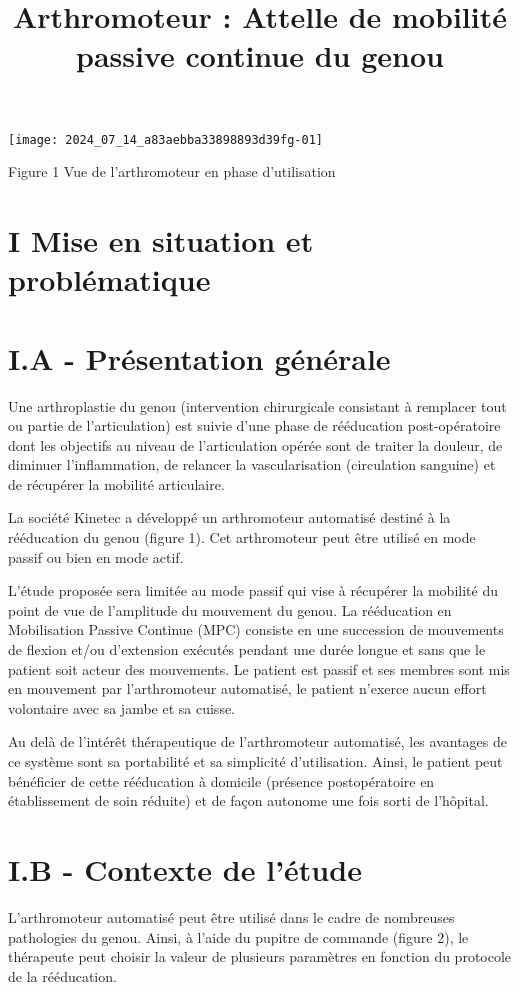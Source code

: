 

\title{Arthromoteur : Attelle de mobilité passive continue du genou }
\maketitle
\begin{center}
\texttt{[image: 2024\_07\_14\_a83aebba33898893d39fg-01]}
\end{center}

Figure 1 Vue de l'arthromoteur en phase d'utilisation

\section*{I Mise en situation et problématique}
\section*{I.A - Présentation générale}
Une arthroplastie du genou (intervention chirurgicale consistant à remplacer tout ou partie de l'articulation) est suivie d'une phase de rééducation post-opératoire dont les objectifs au niveau de l'articulation opérée sont de traiter la douleur, de diminuer l'inflammation, de relancer la vascularisation (circulation sanguine) et de récupérer la mobilité articulaire.

La société Kinetec a développé un arthromoteur automatisé destiné à la rééducation du genou (figure 1). Cet arthromoteur peut être utilisé en mode passif ou bien en mode actif.

L'étude proposée sera limitée au mode passif qui vise à récupérer la mobilité du point de vue de l'amplitude du mouvement du genou. La rééducation en Mobilisation Passive Continue (MPC) consiste en une succession de mouvements de flexion et/ou d'extension exécutés pendant une durée longue et sans que le patient soit acteur des mouvements. Le patient est passif et ses membres sont mis en mouvement par l'arthromoteur automatisé, le patient n'exerce aucun effort volontaire avec sa jambe et sa cuisse.

Au delà de l'intérêt thérapeutique de l'arthromoteur automatisé, les avantages de ce système sont sa portabilité et sa simplicité d'utilisation. Ainsi, le patient peut bénéficier de cette rééducation à domicile (présence postopératoire en établissement de soin réduite) et de façon autonome une fois sorti de l'hôpital.

\section*{I.B - Contexte de l'étude}
L'arthromoteur automatisé peut être utilisé dans le cadre de nombreuses pathologies du genou. Ainsi, à l'aide du pupitre de commande (figure 2), le thérapeute peut choisir la valeur de plusieurs paramètres en fonction du protocole de la rééducation.

